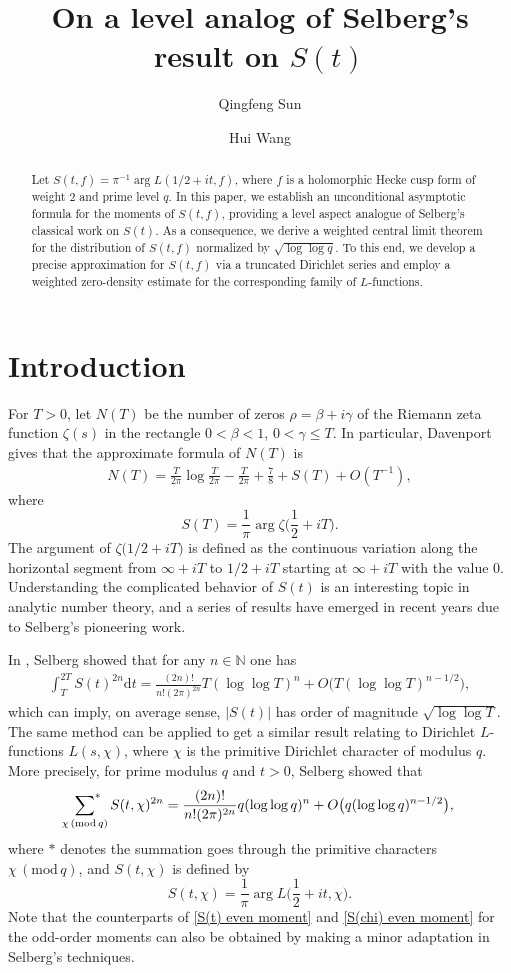 \documentclass[11pt,reqno]{amsart}
\title[]
{On a level analog of Selberg's result on $S(t)$}
\author{Qingfeng Sun}
\author{Hui Wang}
\date{}
\newcommand{\bea}{\begin{eqnarray}}
\newcommand{\eea}{\end{eqnarray}}
\newcommand{\bna}{\begin{eqnarray*}}
\newcommand{\ena}{\end{eqnarray*}}
\numberwithin{equation}{section}
\theoremstyle{plain}
\theoremstyle{definition}
\renewcommand{\bmod}[1]{\,(\mathrm{mod\,}{#1})}
\begin{document}
\begin{abstract}
Let $S(t,f)=\pi^{-1}\arg L(1/2+it, f)$, where $f$ is a holomorphic Hecke cusp form of weight $2$ and prime level $q$.
{In this paper, we establish an unconditional asymptotic formula for the moments of $S(t,f)$,
providing a level aspect analogue of Selberg's classical work on $S(t)$.
As a consequence, we derive a weighted central limit theorem for the distribution of $S(t,f)$ normalized by $\sqrt{\log\log q}$.
To this end, we develop a precise approximation for $S(t,f)$ via a truncated Dirichlet series and employ a weighted zero-density estimate for the corresponding family of $L$-functions.}
\end{abstract}
\maketitle

\section{Introduction}
\setcounter{equation}{0}
For $T>0$, let $N(T)$ be the number of zeros $\rho=\beta+i\gamma$ of the Riemann zeta function $\zeta(s)$ in the rectangle $0<\beta<1$, $0<\gamma\leq T$.
In particular, Davenport \cite[Chapter 15]{Davenport} gives that the approximate formula of $N(T)$ is
\bna
N(T)=\frac{T}{2\pi}\log \frac{T}{2\pi}-\frac{T}{2\pi}+\frac{7}{8}+S(T)+O(T^{-1}),
\ena
where $$S(T)=\frac{1}{\pi}\arg \zeta\big(\frac{1}{2}+iT\big).$$
The argument of $\zeta\big(1/2+iT\big)$ is defined as the continuous variation along the horizontal
segment from $\infty+iT$ to $1/2+iT$ starting at $\infty+iT$ with the value $0$.
Understanding the complicated behavior of $S(t)$ is an interesting topic in analytic number theory,
and a series of results have emerged in recent years due to Selberg's pioneering work.

In \cite{Selberg, Selberg1}, Selberg showed that for any $n\in \mathbb{N}$ one has
\bea\label{S(t) even moment}
\int_{T}^{2T}S(t)^{2n}\mathrm{d}t=\frac{(2n)!}{n!(2\pi)^{2n}}T(\log\log T)^n+O\big(T(\log\log T)^{n-1/2}\big),
\eea
which can imply, on average sense, $|S(t)|$ has order of magnitude $\sqrt{\log\log T}$.
The same method can be applied to get a similar result relating to Dirichlet $L$-functions $L(s,\chi)$,
where $\chi$ is the primitive Dirichlet character of modulus $q$.
More precisely, for prime modulus $q$ and $t>0$, Selberg \cite{Selberg2} showed that
\bea\label{S(chi) even moment}
\sideset{}{^*}\sum_{\chi \bmod q} S(t, \chi)^{2n}=\frac{(2n)!}{n!(2\pi)^{2n}}q(\log\log q)^n+O\big(q(\log\log q)^{n-1/2}\big),
\eea
where $*$ denotes the summation goes through the primitive characters $\chi \bmod q$,
and $S(t,\chi)$ is defined by $$S(t,\chi)=\frac{1}{\pi}\arg L\big(\frac{1}{2}+i t, \chi\big).$$
Note that the counterparts of \eqref{S(t) even moment} and \eqref{S(chi) even moment} for the odd-order moments
can also be obtained by making a minor adaptation in Selberg's techniques.
\end{document}
